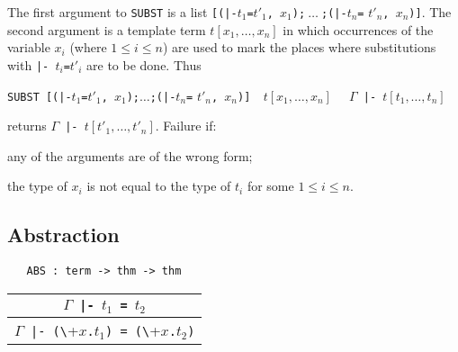 \noindent
The first argument to {\small\verb+SUBST+} is a list
{\small\verb+[(|-+}$t_1${\small\verb+=+}$t'_1${\small\verb+, +}$x_1${\small\verb+);+}$\:\ldots\:${\small\verb+;(|-+}$t_n${\small\verb+=+}
$t'_n${\small\verb+, +}$x_n${\small\verb+)]+}.  The second argument is a
template term $t[x_1,\ldots,x_n]$ in which occurrences of the variable
$x_i$ (where $1 \leq i\leq n$) are used to mark the places where
substitutions with {\small\verb+|- +}$t_i${\small\verb+=+}$t'_i$ are to be
done. Thus

\bigskip

{\small\verb+SUBST [(|-+}$t_1${\small\verb+=+}$t'_1${\small\verb+, +}$x_1${\small\verb+);+}$\ldots${\small\verb+;(|-+}$t_n${\small\verb+=+}
$t'_n${\small\verb+, +}$x_n${\small\verb+)]  +}$t[x_1,\ldots,x_n]${\small\verb+  +}
$\Gamma${\small\verb+ |- +}$t[t_1,\ldots,t_n]$

\bigskip

\noindent returns $\Gamma${\small\verb+ |- +}$t[t'_1,\ldots,t'_n]$.
Failure if:
\begin{myenumerate}
\item any of the arguments are of the wrong form;
\item the type of $x_i$ is not equal to the type of $t_i$ for some
$1\leq i\leq n$.
\end{myenumerate}

\subsection{Abstraction}


\begin{boxed}
\begin{verbatim}
   ABS : term -> thm -> thm
\end{verbatim}\end{boxed}


\begin{center}
\begin{tabular}{c}
$\Gamma${\small\verb+ |- +}$t_1${\small\verb+ = +}$t_2$ \\ \hline
$\Gamma${\small\verb+ |- (\+}$x${\small\verb+.+}$t_1${\small\verb+) = (\+}$x${\small\verb+.+}$t_2${\small\verb+)+} \\
\end{tabular}
\end{center}

